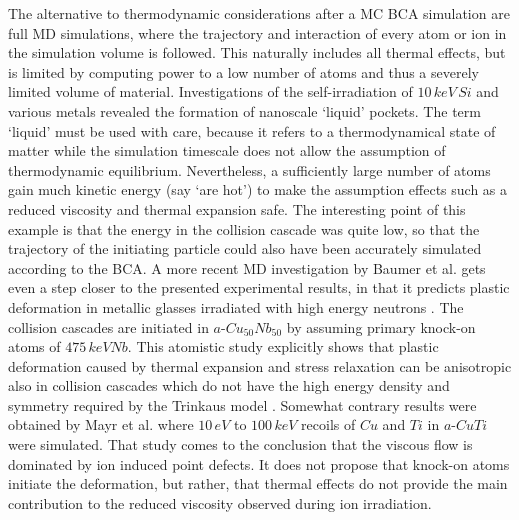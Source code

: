 The alternative to thermodynamic considerations after a MC BCA simulation are full MD simulations, where the trajectory and interaction of every atom or ion in the simulation volume is followed. This naturally includes all thermal effects, but is limited by computing power to a low number of atoms and thus a severely limited volume of material. Investigations of the self-irradiation of $10\,keV\,Si$ and various metals \cite{nordlund_defect_1998} revealed the formation of nanoscale `liquid' pockets. The term `liquid' must be used with care, because it refers to a thermodynamical state of matter while the simulation timescale does not allow the assumption of thermodynamic equilibrium. Nevertheless, a sufficiently large number of atoms gain much kinetic energy (say `are hot') to make the assumption effects such as a reduced viscosity and thermal expansion safe. The interesting point of this example is that the energy in the collision cascade was quite low, so that the trajectory of the initiating particle could also have been accurately simulated according to the BCA. A more recent MD investigation by Baumer et al. gets even a step closer to the presented experimental results, in that it predicts plastic deformation in metallic glasses irradiated with high energy neutrons \cite{baumer_prediction_2014}. The collision cascades are initiated in $a$-$Cu_{50}Nb_{50}$ by assuming primary knock-on atoms of $475\,keV Nb$. This atomistic study explicitly shows that plastic deformation caused by thermal expansion and stress relaxation can be anisotropic also in collision cascades which do not have the high energy density and symmetry required by the Trinkaus model \cite{trinkaus_viscoelastic_1995}. Somewhat contrary results were obtained by Mayr et al. \cite{mayr_mechanisms_2003} where $10\,eV$ to $100\,keV$ recoils of $Cu$ and $Ti$ in $a$-$CuTi$ were simulated. That study comes to the conclusion that the viscous flow is dominated by ion induced point defects. It does not propose that knock-on atoms initiate the deformation, but rather, that thermal effects do not provide the main contribution to the reduced viscosity observed during ion irradiation.


